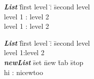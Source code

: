 
\begin{tabbing}
    \emph{\bfseries List} \= first level \= : \= second level\\
    \> level 1 \> : \> level 2\\
    \> level 1 \> : \> level 2 
\end{tabbing}

\begin{tabbing}
    \emph{\bfseries List} \= first level \= : \= second level \\
    \> level 1\>:\>level 2\\
    \emph{\bfseries newList} \= set \=new \=tab \= stop\\
    \> hi\> : \>nicew\>too  %
\end{tabbing}

